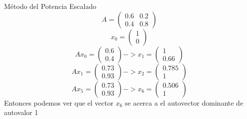   \begin{frame}
\begin{solution}
    Método del Potencia Escalado
    \begin{equation*}
            A=\begin{pmatrix}0.6 & 0.2\\0.4 & 0.8 \end{pmatrix}   
         \end{equation*}
          \begin{equation*}
           x_{0}= \begin{pmatrix}1\\0 \end{pmatrix}
         \end{equation*}
         \begin{equation*}
           Ax_{0}= \begin{pmatrix}0.6\\0.4 \end{pmatrix}->x_{1}=\begin{pmatrix}1\\0.66 \end{pmatrix}
         \end{equation*}
         \begin{equation*}
           Ax_{1}= \begin{pmatrix}0.73\\0.93 \end{pmatrix}->x_{2}=\begin{pmatrix}0.785\\1 \end{pmatrix}
         \end{equation*}
         \begin{equation*}
           Ax_{5}= \begin{pmatrix}0.73\\0.93 \end{pmatrix}->x_{6}=\begin{pmatrix}0.506\\1 \end{pmatrix}
         \end{equation*}
         Entonces podemos ver que el vector $x_{6}$ se acerca a el autovector dominante de autovalor 1 
\end{solution}
    
\end{frame}